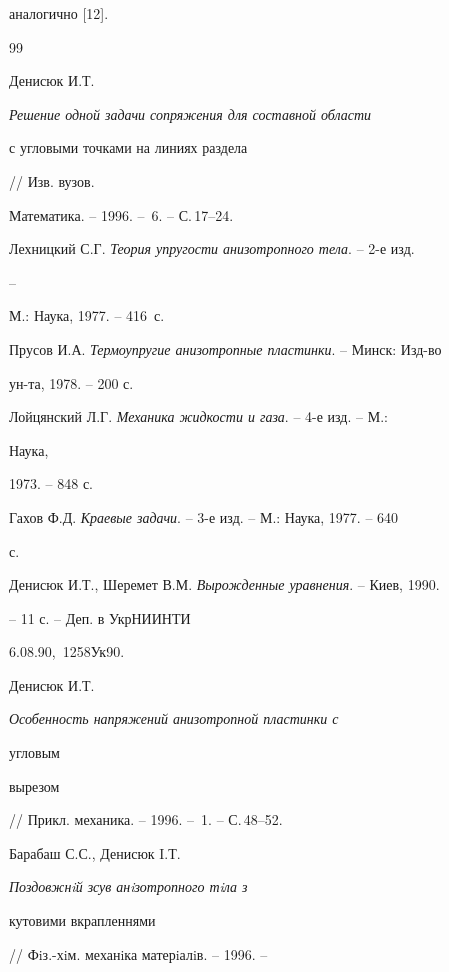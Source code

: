 аналогично [12]. 


 


\begin{thebibliography}{99} 


 




Денисюк И.Т. {\em Решение одной задачи сопряжения для составной области 


с угловыми точками на линиях раздела} // Изв. вузов. 


Математика. -- 1996. -- \No\,6. -- С.\,17--24. 




Лехницкий С.Г. {\em Теория упругости анизотропного тела}. -- 2-е изд. 


-- 


М.: Наука, 1977. -- 416~с. 




Прусов И.А. {\em Термоупругие анизотропные пластинки}. -- Минск: Изд-во 


ун-та, 1978. -- 200 с. 




Лойцянский Л.Г. {\em Механика жидкости и газа}. -- 4-е изд. -- М.: 


Наука, 


1973. -- 848 с. 




Гахов Ф.Д. {\em Краевые задачи}. -- 3-е изд. -- М.: Наука, 1977. -- 640 


с. 




Денисюк И.Т., Шеремет В.М. {\em Вырожденные уравнения}. -- Киев, 1990.


-- 11 с. -- Деп. в УкрНИИНТИ 


6.08.90, \No\,1258Ук90. 




Денисюк И.Т. {\em Особенность напряжений анизотропной пластинки с 


угловым 


вырезом} // Прикл. механика. -- 1996. -- \No\,1. -- С.\,48--52. 




Барабаш С.С., Денисюк I.Т. {\em Поздовжнiй зсув анiзотропного тiла з 


кутовими вкрапленнями} // Фiз.-хiм. механiка матерiалiв. -- 1996. -- 



\end{thebibliography}
